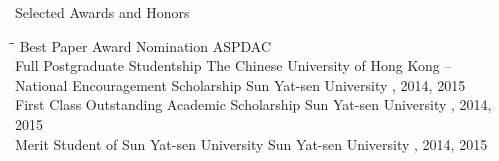 
\begin{rSection}{Selected Awards and Honors}
\begin{tabbing}
\hspace{3.2in}\= \hspace{2.8in}\= \kill
    Best Paper Award Nomination                \>ASPDAC                            \\
    Full Postgraduate Studentship                \>The Chinese University of Hong Kong                       --      \\
    National Encouragement Scholarship      \> Sun Yat-sen University     , 2014, 2015 \\
    First Class Outstanding Academic Scholarship             \> Sun Yat-sen University     , 2014, 2015 \\
    Merit Student of Sun Yat-sen University                   \> Sun Yat-sen University     , 2014, 2015
\end{tabbing}
\end{rSection}

